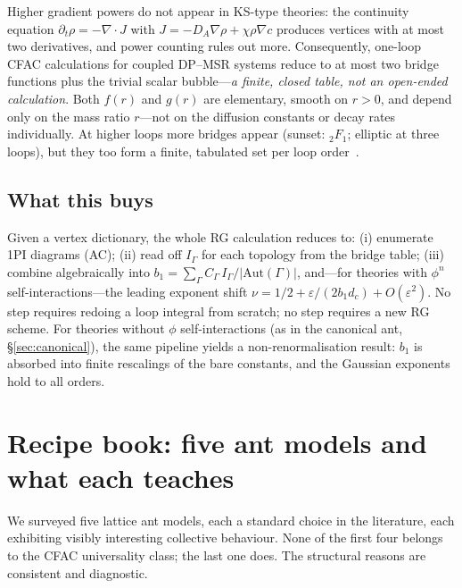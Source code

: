 \documentclass[10pt,a4paper,twocolumn]{article}
\theoremstyle{definition}
\begin{document}
Higher gradient powers do not appear in KS-type theories: the
continuity equation $\partial_t\rho = -\nabla\cdot J$ with
$J = -D_A\nabla\rho + \chi\rho\nabla c$ produces vertices with
at most two derivatives, and power counting rules out more.
Consequently, one-loop CFAC calculations for coupled DP--MSR
systems reduce to at most two bridge functions plus the trivial
scalar bubble---\emph{a finite, closed table, not an open-ended
calculation}.  Both $f(r)$ and $g(r)$ are elementary, smooth on
$r>0$, and depend only on the mass ratio $r$---not on the
diffusion constants or decay rates individually.  At higher
loops more bridges appear (sunset: ${}_2F_1$; elliptic at three
loops), but they too form a finite, tabulated set per loop
order~\citep{Amarteifio2026cfac}.

\subsection{What this buys}
Given a vertex dictionary, the whole RG calculation reduces to:
(i) enumerate 1PI diagrams (AC); (ii) read off $I_\Gamma$ for
each topology from the bridge table; (iii) combine
algebraically into $b_1 = \sum_\Gamma C_\Gamma\,I_\Gamma /
|\mathrm{Aut}(\Gamma)|$, and---for theories with $\phi^n$
self-interactions---the leading exponent shift
$\nu = 1/2 + \varepsilon/(2b_1 d_c) + O(\varepsilon^2)$.  No step
requires redoing a loop integral from scratch; no step requires a
new RG scheme.  For theories without $\phi$ self-interactions
(as in the canonical ant, \S\ref{sec:canonical}), the same
pipeline yields a non-renormalisation result: $b_1$ is
absorbed into finite rescalings of the bare constants, and the
Gaussian exponents hold to all orders.

\section{Recipe book: five ant models and what each teaches}
\label{sec:recipe}

We surveyed five lattice ant models, each a standard choice in
the literature, each exhibiting visibly interesting collective
behaviour.  None of the first four belongs to the CFAC
universality class; the last one does.  The structural reasons
are consistent and diagnostic.
\end{document}
